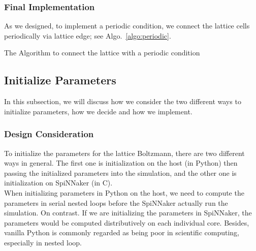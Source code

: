 \subsubsection{Final Implementation}
As we designed, to implement a periodic condition, we connect the lattice cells periodically via lattice edge; see Algo.~\ref{algo:periodic}.\\

\begin{algorithm}
 \caption{The Algorithm to connect the lattice with a periodic condition}
 \label{algo:periodic}
\end{algorithm}




\subsection{Initialize Parameters} \label{sec:ip}
In this subsection, we will discuss how we consider the two different ways to initialize parameters, how we decide and how we implement.\\
\subsubsection{Design Consideration}
To initialize the parameters for the lattice Boltzmann, there are two different ways in general. The first one is initialization on the host (in Python) then passing the initialized parameters into the simulation, and the other one is initialization on SpiNNaker (in C).\\

When initializing parameters in Python on the host, we need to compute the parameters in serial nested loops before the SpiNNaker actually run the simulation. On contrast. If we are initializing the parameters in SpiNNaker, the parameters would be computed distributively on each individual core. Besides, vanilla Python is commonly regarded as being poor in scientific computing, especially in nested loop.\\

